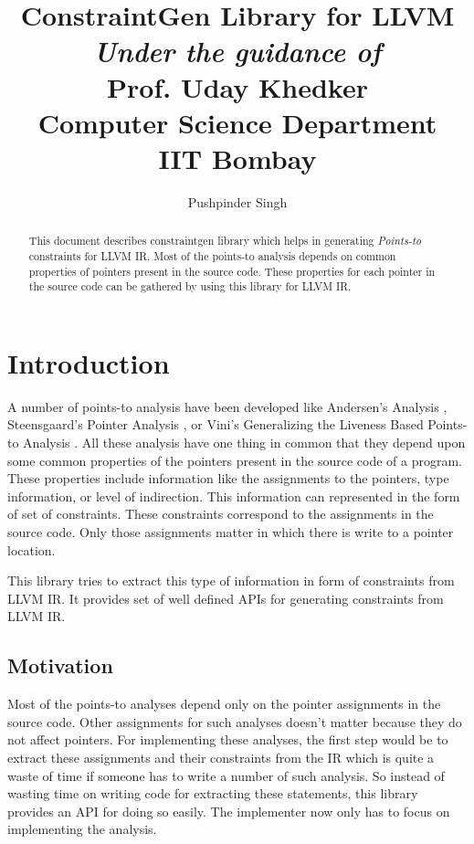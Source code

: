 \documentclass[a4paper,11pt]{report}
\title{
    \huge ConstraintGen Library for LLVM\\
    \vspace{15pt}
    \normalfont \normalsize \textit{Under the guidance of}\\
    \vspace{3pt}
    \normalsize Prof. Uday Khedker\\
    \normalsize Computer Science Department\\
    \normalsize IIT Bombay
}
\author{
    Pushpinder Singh
}
\begin{document}
\maketitle

\begin{abstract}

This document describes constraintgen library which helps in generating \textit{Points-to}
constraints for LLVM IR. Most of the points-to analysis depends on common
properties of pointers present in the source code. These properties for
each pointer in the source code can be gathered by using this library for
LLVM IR.

\end{abstract}

\tableofcontents

\chapter{Introduction}

A number of points-to analysis have been developed like Andersen's Analysis
\cite{Andersons}, Steensgaard's Pointer Analysis \cite{Steensgaard}, or Vini's
Generalizing the Liveness Based Points-to Analysis \cite{Vini:2014}. All these
analysis have one thing in common that they depend upon some common properties of
the pointers  present in the source code of a program. These properties include
information like the assignments to the pointers, type information, or level
of indirection. This information can represented in the form of set of constraints.
These constraints correspond to the assignments in the source code. Only those 
assignments matter in which there is write to a pointer location.

This library tries to extract this type of information in form of constraints 
from LLVM IR. It provides set of well defined APIs for generating constraints 
from LLVM IR.

\section{Motivation}
Most of the points-to analyses depend only on the pointer assignments in
the source code. Other assignments for such analyses doesn't matter because
they do not affect pointers. For implementing these analyses, the
first step would be to extract these assignments and their constraints from
the IR which is quite a waste of time if someone has to write a number of such analysis. So instead of
wasting time on writing code for extracting these statements, this library 
provides an API for doing so easily. The implementer now only has to focus on 
implementing the analysis.
\end{document}
